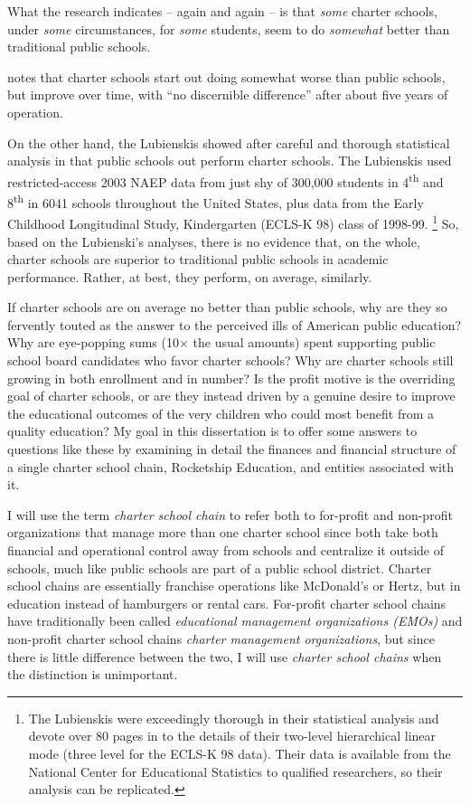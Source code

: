 What the research indicates – again and again – is that \textit{some} charter schools, under \textit{some} circumstances, for \textit{some} students, seem to do \textit{somewhat} better than traditional public schools. \citeauthor{Garcia2018}
\begin{comment}
  [p.119]{Garcia2018}
\end{comment}
notes that charter schools start out doing somewhat worse than public schools, but improve over time, with ``no discernible difference'' \parencite[119]{Garcia2018} after about five years of operation.

On the other hand, the Lubienskis showed after careful and thorough statistical analysis in \parencite{Lubienski.Lubienski2014} that public schools out perform charter schools. The Lubienskis used restricted-access 2003 NAEP data from just shy of 300,000 students in 4\textsuperscript{th} and 8\textsuperscript{th} in 6041 schools throughout the United States, plus data from the Early Childhood Longitudinal Study, Kindergarten (ECLS-K 98) class of 1998-99. \footnote{The Lubienskis were exceedingly thorough in their statistical analysis and devote over 80 pages in \textcite{Lubienski.Lubienski2014} to the details of their two-level hierarchical linear mode (three level for the ECLS-K 98 data). Their data is available from the National Center for Educational Statistics to qualified researchers, so their analysis can be replicated.} So, based on the Lubienski’s analyses, there is no evidence that, on the whole, charter schools are superior to traditional public schools in academic performance. Rather, at best, they perform, on average, similarly.

If charter schools are on average no better than public schools, why are they so fervently touted as the answer to the perceived ills of American public education? Why are eye-popping sums (10× the usual amounts) spent supporting public school board candidates who favor charter schools? Why are charter schools still growing in both enrollment and in number? Is the profit motive is the overriding goal of charter schools, or are they instead driven by a genuine desire to improve the educational outcomes of the very children who could most benefit from a quality education? My goal in this dissertation is to offer some answers to questions like these by examining in detail the finances and financial structure of a single charter school chain, Rocketship Education, and entities associated with it.

I will use the term \textit{charter school chain} to refer both to for-profit and non-profit organizations that manage more than one charter school since both take both financial and operational control away from schools and centralize it outside of schools, much like public schools are part of a public school district.  Charter school chains are essentially franchise operations like McDonald's or Hertz, but in education instead of hamburgers or rental cars. For-profit charter school chains have traditionally been called \textit{educational management organizations (EMOs)} and non-profit charter school chains \textit{charter management organizations}, but since there is little difference between the two, I will use \textit{charter school chains} when the distinction is unimportant.

